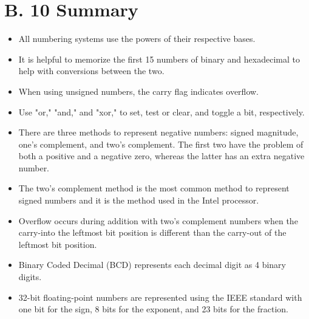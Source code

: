 \documentclass[10pt]{book}
\begin{document}
\section*{B. 10 Summary}
\begin{itemize}
  \item All numbering systems use the powers of their respective bases.
  \item It is helpful to memorize the first 15 numbers of binary and hexadecimal to help with conversions between the two.
  \item When using unsigned numbers, the carry flag indicates overflow.
  \item Use "or," "and," and "xor," to set, test or clear, and toggle a bit, respectively.
  \item There are three methods to represent negative numbers: signed magnitude, one's complement, and two's complement. The first two have the problem of both a positive and a negative zero, whereas the latter has an extra negative number.
  \item The two's complement method is the most common method to represent signed numbers and it is the method used in the Intel processor.
  \item Overflow occurs during addition with two's complement numbers when the carry-into the leftmost bit position is different than the carry-out of the leftmost bit position.
  \item Binary Coded Decimal (BCD) represents each decimal digit as 4 binary digits.
  \item 32-bit floating-point numbers are represented using the IEEE standard with one bit for the sign, 8 bits for the exponent, and 23 bits for the fraction.
\end{itemize}
\end{document}
